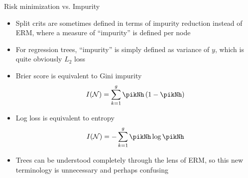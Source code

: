\documentclass[11pt,compress,t,notes=noshow, xcolor=table]{beamer}
\begin{document}
\begin{vbframe}{Risk minimization vs. Impurity}

\begin{itemize}
\item Split crits are sometimes defined in terms of impurity reduction instead of ERM, where a measure of ``impurity'' is defined per node
\item For regression trees, \enquote{impurity} is simply defined as variance of $y$, which is quite obviously $L_2$ loss

\item Brier score is equivalent to Gini impurity
$$I(\Np) = \sumkg \pikNh \left( 1-\pikNh \right)$$
\item Log loss is equivalent to entropy
$$I(\Np) = -\sumkg \pikNh \log \pikNh$$
\item Trees can be understood completely through the lens of ERM, so this new terminology is unnecessary and perhaps confusing
\end{itemize}
\end{vbframe}
\end{document}

